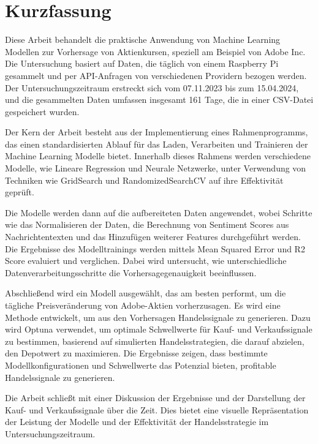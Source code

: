 
\section*{Kurzfassung}\label{sec: Kurzfassung}
Diese Arbeit behandelt die praktische Anwendung von Machine Learning Modellen zur Vorhersage von Aktienkursen, speziell am Beispiel von Adobe Inc. Die Untersuchung basiert auf Daten, die täglich von einem Raspberry Pi gesammelt und per API-Anfragen von verschiedenen Providern bezogen werden. Der Untersuchungszeitraum erstreckt sich vom 07.11.2023 bis zum 15.04.2024, und die gesammelten Daten umfassen insgesamt 161 Tage, die in einer CSV-Datei gespeichert wurden.
\par
Der Kern der Arbeit besteht aus der Implementierung eines Rahmenprogramms, das einen standardisierten Ablauf für das Laden, Verarbeiten und Trainieren der Machine Learning Modelle bietet. Innerhalb dieses Rahmens werden verschiedene Modelle, wie Lineare Regression und Neurale Netzwerke, unter Verwendung von Techniken wie GridSearch und RandomizedSearchCV auf ihre Effektivität geprüft.
\par
Die Modelle werden dann auf die aufbereiteten Daten angewendet, wobei Schritte wie das Normalisieren der Daten, die Berechnung von Sentiment Scores aus Nachrichtentexten und das Hinzufügen weiterer  Features durchgeführt werden. Die Ergebnisse des Modelltrainings werden mittels Mean Squared Error und R2 Score evaluiert und verglichen. Dabei wird untersucht, wie unterschiedliche Datenverarbeitungsschritte die Vorhersagegenauigkeit beeinflussen.
\par
Abschließend wird ein Modell ausgewählt, das am besten performt, um die tägliche Preisveränderung von Adobe-Aktien vorherzusagen. Es wird eine Methode entwickelt, um aus den Vorhersagen Handelssignale zu generieren. Dazu wird Optuna verwendet, um optimale Schwellwerte für Kauf- und Verkaufssignale zu bestimmen, basierend auf simulierten Handelsstrategien, die darauf abzielen, den Depotwert zu maximieren. Die Ergebnisse zeigen, dass bestimmte Modellkonfigurationen und Schwellwerte das Potenzial bieten, profitable Handelssignale zu generieren.
\par
Die Arbeit schließt mit einer Diskussion der Ergebnisse und der Darstellung der Kauf- und Verkaufssignale über die Zeit. Dies bietet eine visuelle Repräsentation der Leistung der Modelle und der Effektivität der Handelsstrategie im Untersuchungszeitraum.

